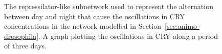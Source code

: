 \begin{figure}[!htb]
\begin{minipage}{\textwidth}
  \centering
  \qquad
\caption{{\bf \protect{}} The repressilator-like subnetwork used to represent the alternation
between day and night that cause the oscillations in {\sf CRY} concentrations in the
network modelled in Section~\ref{sec:animo-drosophila}.
{\bf \protect{}} A graph plotting the oscillations in {\sf CRY} along
a period of three days.}\label{fig:repressilator}
\end{minipage}
\end{figure}



